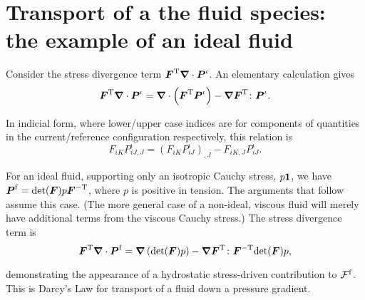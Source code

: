 
\section{Transport of a the fluid species: the example of an ideal
  fluid}
\label{ideal-fluid-transport}

Consider the stress divergence term
$\mbox{\boldmath$ F$}^\mathrm{T}\mbox{\boldmath$\nabla$}\cdot\mbox{\boldmath$ P$}^\iota$. An elementary calculation
gives
\begin{equation}
\mbox{\boldmath$ F$}^\mathrm{T}\mbox{\boldmath$\nabla$}\cdot\mbox{\boldmath$ P$}^\iota =
\mbox{\boldmath$\nabla$}\cdot\left(\mbox{\boldmath$ F$}^\mathrm{T}\mbox{\boldmath$ P$}^\iota\right) -
\mbox{\boldmath$\nabla$}\mbox{\boldmath$ F$}^\mathrm{T}\colon\mbox{\boldmath$ P$}^\iota. \label{stressdivI}
\end{equation}

\noindent In indicial form, where lower/upper case indices are for
components of quantities in the current/reference configuration
respectively, this relation is
\begin{displaymath}
F_{iK}P^\iota_{iJ,J} = \left(F_{iK}P^\iota_{iJ}\right)_{,J} -
F_{iK,J}P^\iota_{iJ}.
\end{displaymath}

\noindent For an ideal fluid, supporting only an isotropic Cauchy
stress, $p{\bf 1}$, we have $\mbox{\boldmath$ P$}^\mathrm{f} =
\mathrm{det}(\mbox{\boldmath$ F$})p\mbox{\boldmath$ F$}^{-\mathrm{T}}$, where $p$ is positive in
tension. The arguments that follow assume this case. (The more
general case of a non-ideal, viscous fluid will merely have
additional terms from the viscous Cauchy stress.) The stress
divergence term is
\begin{equation}
\mbox{\boldmath$ F$}^\mathrm{T}\mbox{\boldmath$\nabla$}\cdot\mbox{\boldmath$ P$}^\mathrm{f} =
\mbox{\boldmath$\nabla$}\left(\mathrm{det}(\mbox{\boldmath$ F$})p\right) -
\mbox{\boldmath$\nabla$}\mbox{\boldmath$ F$}^\mathrm{T}\colon\mbox{\boldmath$ F$}^{-\mathrm{T}}\mathrm{det}(\mbox{\boldmath$ F$})p,
\end{equation}

\noindent demonstrating the appearance of a hydrostatic
stress-driven contribution to ${\mathcal F}^\mathrm{f}$. This
is Darcy's Law for transport of a fluid down a pressure gradient.

